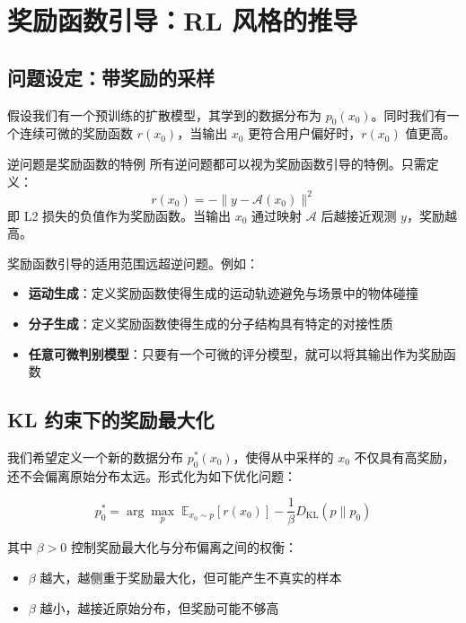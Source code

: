 \section{奖励函数引导：RL 风格的推导}

\subsection{问题设定：带奖励的采样}

假设我们有一个预训练的扩散模型，其学到的数据分布为 $p_0(x_0)$。同时我们有一个连续可微的奖励函数 $r(x_0)$，当输出 $x_0$ 更符合用户偏好时，$r(x_0)$ 值更高。

\begin{importantbox}{逆问题是奖励函数的特例}
所有逆问题都可以视为奖励函数引导的特例。只需定义：
$$r(x_0) = -\| y - \mathcal{A}(x_0) \|^2$$
即 L2 损失的负值作为奖励函数。当输出 $x_0$ 通过映射 $\mathcal{A}$ 后越接近观测 $y$，奖励越高。
\end{importantbox}

奖励函数引导的适用范围远超逆问题。例如：

\begin{itemize}
    \item \textbf{运动生成}：定义奖励函数使得生成的运动轨迹避免与场景中的物体碰撞
    \item \textbf{分子生成}：定义奖励函数使得生成的分子结构具有特定的对接性质
    \item \textbf{任意可微判别模型}：只要有一个可微的评分模型，就可以将其输出作为奖励函数
\end{itemize}

\subsection{KL 约束下的奖励最大化}

我们希望定义一个新的数据分布 $p_0^*(x_0)$，使得从中采样的 $x_0$ 不仅具有高奖励，还不会偏离原始分布太远。形式化为如下优化问题：

$$p_0^* = \arg\max_{p} \; \mathbb{E}_{x_0 \sim p}[r(x_0)] - \frac{1}{\beta} D_{\mathrm{KL}}(p \| p_0)$$

其中 $\beta > 0$ 控制奖励最大化与分布偏离之间的权衡：
\begin{itemize}
    \item $\beta$ 越大，越侧重于奖励最大化，但可能产生不真实的样本
    \item $\beta$ 越小，越接近原始分布，但奖励可能不够高
\end{itemize}

